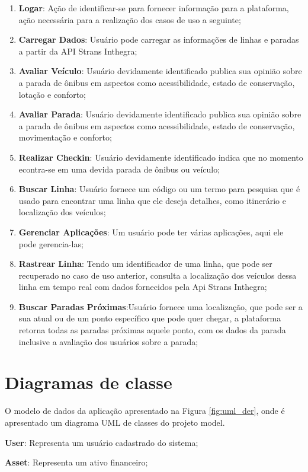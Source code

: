 \begin{enumerate}
  \item \textbf{Logar}: Ação de identificar-se para fornecer informação para a plataforma, ação necessária para a realização dos casos de uso a seguinte;
  \item \textbf{Carregar Dados}: Usuário pode carregar as informações de linhas e paradas a partir da API Strans Inthegra;
  \item \textbf{Avaliar Veículo}: Usuário devidamente identificado publica sua opinião sobre a parada de ônibus em aspectos como acessibilidade, estado de conservação, lotação e conforto;
  \item \textbf{Avaliar Parada}: Usuário devidamente identificado publica sua opinião sobre a parada de ônibus em aspectos como acessibilidade, estado de conservação, movimentação e conforto;
  \item \textbf{Realizar Checkin}: Usuário devidamente identificado indica que no momento econtra-se em uma devida parada de ônibus ou veículo;
  \item \textbf{Buscar Linha}: Usuário fornece um código ou um termo para pesquisa que é usado para encontrar uma linha que ele deseja detalhes, como itinerário e localização dos veículos;
  \item \textbf{Gerenciar Aplicações}: Um usuário pode ter várias aplicações, aqui ele pode gerencia-las;
  \item \textbf{Rastrear Linha}: Tendo um identificador de uma linha, que pode ser recuperado no caso de uso anterior, consulta a localização dos veículos dessa linha em tempo real com dados fornecidos pela Api Strans Inthegra;
  \item \textbf{Buscar Paradas Próximas}:Usuário fornece uma localização, que pode ser a sua atual ou de um ponto específico que pode quer chegar, a plataforma retorna todas as paradas próximas aquele ponto, com os dados da parada inclusive a avaliação dos usuários sobre a parada;
\end{enumerate}

\section{Diagramas de classe} \label{sec:modelagem:classe}

O modelo de dados da aplicação apresentado na Figura \ref{fig:uml_der}, onde é apresentado um diagrama UML de classes do projeto model.
\begin{lista}
  \item \textbf{User}: Representa um usuário cadastrado do sistema;
  \item \textbf{Asset}: Representa um ativo financeiro;
\end{lista}

